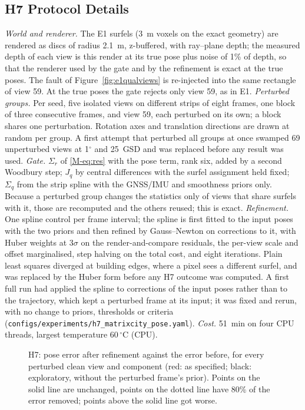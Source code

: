 \subsection{H7 Protocol Details}
\label{sup:h7}
\emph{World and renderer.} The E1 surfels (3~m voxels on the exact geometry) are rendered as discs of radius
2.1~m, z-buffered, with ray--plane depth; the measured depth of each view is this render at its true pose
plus noise of 1\% of depth, so that the renderer used by the gate and by the refinement is exact at the true
poses. The fault of Figure~\ref{fig:e1qualviews} is re-injected into the same rectangle of view 59. At the true
poses the gate rejects only view 59, as in E1.
\emph{Perturbed groups.} Per seed, five isolated views on different strips of eight frames, one block of three
consecutive frames, and view 59, each perturbed on its own; a block shares one perturbation. Rotation axes and
translation directions are drawn at random per group. A first attempt that perturbed all groups at once
swamped 69 unperturbed views at 1$^{\circ}$ and 25~GSD and was replaced before any result was used.
\emph{Gate.} $\Sigma_r$ of \eqref{M-eq:res} with the pose term, rank six, added by a second Woodbury step;
$J_q$ by central differences with the surfel assignment held fixed; $\Sigma_q$ from the strip spline with the
GNSS/IMU and smoothness priors only. Because a perturbed group changes the statistics only of views that
share surfels with it, those are recomputed and the others reused; this is exact.
\emph{Refinement.} One spline control per frame interval; the spline is first fitted to the input poses with
the two priors and then refined by Gauss--Newton on corrections to it, with Huber weights at $3\sigma$ on the
render-and-compare residuals, the per-view scale and offset marginalised, step halving on the total cost, and
eight iterations. Plain least squares diverged at building edges, where a pixel sees a different surfel, and
was replaced by the Huber form before any H7 outcome was computed. A first full run had applied the spline to
corrections of the input poses rather than to the trajectory, which kept a perturbed frame at its input; it
was fixed and rerun, with no change to priors, thresholds or criteria (\texttt{configs/experiments/h7\_matrixcity\_pose.yaml}).
\emph{Cost.} 51~min on four CPU threads, largest temperature 60\,$^{\circ}$C (CPU).

\begin{figure}[!htbp]
\centering

\caption{H7: pose error after refinement against the error before, for every perturbed clean view and
component (red: as specified; black: exploratory, without the perturbed frame's prior). Points on the solid
line are unchanged, points on the dotted line have 80\% of the error removed; points above the solid line got
worse.}
\label{fig:h7scatter}
\end{figure}
\FloatBarrier

